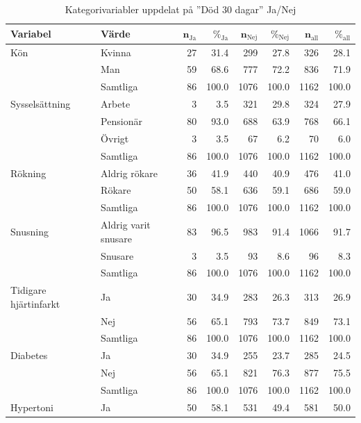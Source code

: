 \begin{table}[htbp]
\centering
\caption{Kategorivariabler uppdelat på ''Död 30 dagar'' Ja/Nej}
\label{tab:dl2}
{\footnotesize
\begin{tabular}{ll|rr|rr|rr}
 \textbf{Variabel} & \textbf{Värde} & $\mathbf{n_{\mathrm{Ja}}}$ & $\mathbf{\%_{\mathrm{Ja}}}$ & $\mathbf{n_{\mathrm{Nej}}}$ & $\mathbf{\%_{\mathrm{Nej}}}$ & $\mathbf{n_{\mathrm{all}}}$ & $\mathbf{\%_{\mathrm{all}}}$ \\ 
  \hline
Kön & Kvinna & 27 & 31.4 & 299 & 27.8 & 326 & 28.1 \\ 
   & Man & 59 & 68.6 & 777 & 72.2 & 836 & 71.9 \\ 
   \hline
 & Samtliga & 86 & 100.0 & 1076 & 100.0 & 1162 & 100.0 \\ 
   \hline
\hline
Sysselsättning & Arbete & 3 & 3.5 & 321 & 29.8 & 324 & 27.9 \\ 
   & Pensionär & 80 & 93.0 & 688 & 63.9 & 768 & 66.1 \\ 
   & Övrigt & 3 & 3.5 & 67 & 6.2 & 70 & 6.0 \\ 
   \hline
 & Samtliga & 86 & 100.0 & 1076 & 100.0 & 1162 & 100.0 \\ 
   \hline
\hline
Rökning & Aldrig rökare & 36 & 41.9 & 440 & 40.9 & 476 & 41.0 \\ 
   & Rökare & 50 & 58.1 & 636 & 59.1 & 686 & 59.0 \\ 
   \hline
 & Samtliga & 86 & 100.0 & 1076 & 100.0 & 1162 & 100.0 \\ 
   \hline
\hline
Snusning & Aldrig varit snusare & 83 & 96.5 & 983 & 91.4 & 1066 & 91.7 \\ 
   & Snusare & 3 & 3.5 & 93 & 8.6 & 96 & 8.3 \\ 
   \hline
 & Samtliga & 86 & 100.0 & 1076 & 100.0 & 1162 & 100.0 \\ 
   \hline
\hline
Tidigare hjärtinfarkt & Ja & 30 & 34.9 & 283 & 26.3 & 313 & 26.9 \\ 
   & Nej & 56 & 65.1 & 793 & 73.7 & 849 & 73.1 \\ 
   \hline
 & Samtliga & 86 & 100.0 & 1076 & 100.0 & 1162 & 100.0 \\ 
   \hline
\hline
Diabetes & Ja & 30 & 34.9 & 255 & 23.7 & 285 & 24.5 \\ 
   & Nej & 56 & 65.1 & 821 & 76.3 & 877 & 75.5 \\ 
   \hline
 & Samtliga & 86 & 100.0 & 1076 & 100.0 & 1162 & 100.0 \\ 
   \hline
\hline
Hypertoni & Ja & 50 & 58.1 & 531 & 49.4 & 581 & 50.0 \\ 

\end{tabular}}
\end{table}
